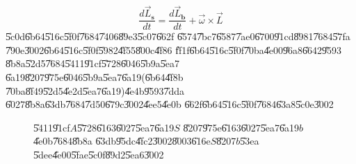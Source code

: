 \documentclass[12pt,a4paper]{article}
\begin{document}
\begin{equation}
\frac{d\vec{L}_{\boldsymbol{s}}}{dt}=\frac{d\vec{L}_{\boldsymbol{b}}}{dt}+%
\vec{\omega}\times \vec{L}  \label{eq1}
\end{equation}%
\U{5c0d}\U{6b64}\U{516c}\U{5f0f}\U{7684}\U{7406}\U{89e3}\U{5c07}\U{662f}%
\U{6574}\U{7bc7}\U{6587}\U{7ae0}\U{6700}\U{91cd}\U{8981}\U{7684}\U{57fa}%
\U{790e}\U{3002}\U{6b64}\U{516c}\U{5f0f}\U{5982}\U{4f55}\U{800c}\U{4f86}%
\U{ff1f}\U{6b64}\U{516c}\U{5f0f}\U{70ba}\U{4e00}\U{96a8}\U{6642}\U{9593}%
\U{8b8a}\U{52d5}\U{7684}\U{5411}\U{91cf}\U{5728}\U{6046}\U{5b9a}\U{5ea7}%
\U{6a19}\U{8207}\U{975e}\U{6046}\U{5b9a}\U{5ea7}\U{6a19}(\U{6b64}\U{4f8b}%
\U{70ba}\U{8f49}\U{52d5}\U{4e2d}\U{5ea7}\U{6a19})\U{4e4b}\U{9593}\U{7dda}%
\U{6027}\U{8b8a}\U{63db}\U{7684}\U{7d50}\U{679c}\U{3002}\U{4ee5}\U{4e0b}%
\U{662f}\U{6b64}\U{516c}\U{5f0f}\U{7684}\U{63a8}\U{5c0e}\U{3002}

\begin{figure}[th]
\caption{{}\U{5411}\U{91cf}$A$\U{5728}\U{6163}\U{6027}\U{5ea7}\U{6a19}$S$%
\U{8207}\U{975e}\U{6163}\U{6027}\U{5ea7}\U{6a19}$b$\U{4e0b}\U{7684}\U{8b8a}%
\U{63db}\U{95dc}\U{4fc2}\U{3002}\U{8003}\U{616e}$S$\U{8207}$b$\U{53ea}%
\U{5dee}\U{4e00}\U{5fae}\U{5c0f}\U{89d2}\U{5ea6}\U{3002}}
\begin{center}
\fbox{}
\end{center}
\label{firstfig}
\end{figure}
\bigskip 
\end{document}
